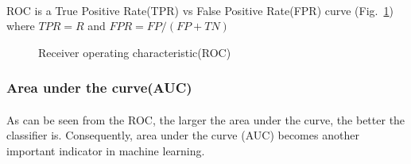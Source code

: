 \paragraph{}
ROC is a True Positive Rate(TPR) vs False Positive Rate(FPR) curve (Fig.~\ref{lr_fig:performance_roc}) where $TPR=R$ and $FPR=FP/(FP+TN)$
\begin{figure}[h!]
    \centering
    \caption[Receiver operating characteristic(ROC)]{Receiver operating characteristic(ROC)}
    \label{lr_fig:performance_roc}
\end{figure}
%
\subsubsection{Area under the curve(AUC)}
\paragraph{}
As can be seen from the ROC, the larger the area under the curve, the better the classifier is.
Consequently, area under the curve (AUC) becomes another important indicator in machine learning.